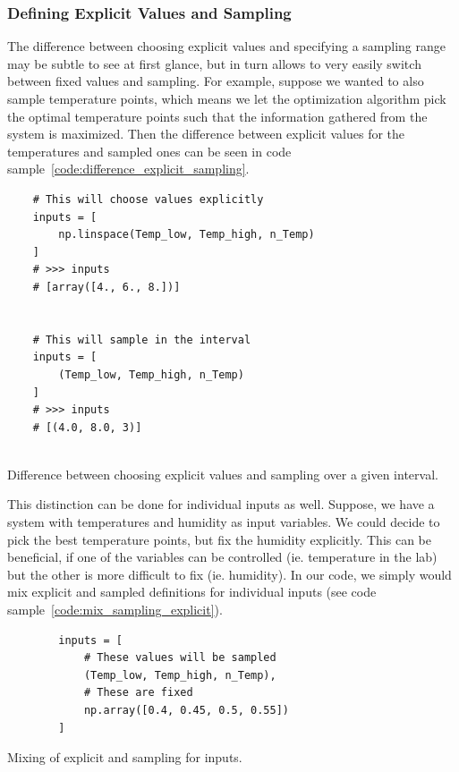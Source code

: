 \documentclass[10pt,A4paper]{article}
\begin{document}
\subsubsection*{Defining Explicit Values and Sampling}
The difference between choosing explicit values and specifying a sampling range may be subtle to see at first glance, but in turn allows to very easily switch between fixed values and sampling.
For example, suppose we wanted to also sample temperature points, which means we let the optimization algorithm pick the optimal temperature points such that the information gathered from the system is maximized.
Then the difference between explicit values for the temperatures and sampled ones can be seen in code sample~\ref{code:difference_explicit_sampling}.\newline
\begin{code}[h]
    \begin{verbatim}
    # This will choose values explicitly
    inputs = [
        np.linspace(Temp_low, Temp_high, n_Temp)
    ]
    # >>> inputs
    # [array([4., 6., 8.])]


    # This will sample in the interval
    inputs = [
        (Temp_low, Temp_high, n_Temp)
    ]
    # >>> inputs
    # [(4.0, 8.0, 3)]


    \end{verbatim}
    \caption{Difference between choosing explicit values and sampling over a given interval.}
    \label{code:difference_explicit_sampling}
\end{code}%
This distinction can be done for individual inputs as well.
Suppose, we have a system with temperatures and humidity as input variables.
We could decide to pick the best temperature points, but fix the humidity explicitly.
This can be beneficial, if one of the variables can be controlled (ie. temperature in the lab) but the other is more difficult to fix (ie. humidity).
In our code, we simply would mix explicit and sampled definitions for individual inputs (see code sample~\ref{code:mix_sampling_explicit}).
\begin{code}[h]
    \begin{verbatim}
        inputs = [
            # These values will be sampled
            (Temp_low, Temp_high, n_Temp),
            # These are fixed
            np.array([0.4, 0.45, 0.5, 0.55])
        ]
    \end{verbatim}
    \caption{Mixing of explicit and sampling for inputs.}
    \label{code:mix_sampling_explicit}
\end{code}
%
\end{document}
